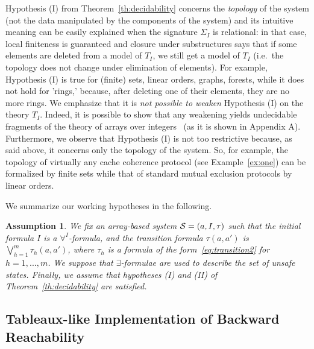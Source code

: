 \documentclass{LMCS}
\newcommand{\cSi}{\ensuremath \mathcal S}
\theoremstyle{plain}\newtheorem{assumption}[thm]{Assumption}
\theoremstyle{plain}\newtheorem{proposition}[thm]{Proposition}
\theoremstyle{plain}\newtheorem{property}[thm]{Property}
\theoremstyle{plain}\newtheorem{example}[thm]{Example}
\theoremstyle{plain}\newtheorem{claim}[thm]{Claim}
\theoremstyle{plain}\newtheorem{lemma}[thm]{Lemma}
\begin{document}
Hypothesis (I) from Theorem~\ref{th:decidability} concerns the
\emph{topology} of the system (not the data manipulated by the
components of the system)
and its intuitive meaning can be easily explained when the signature
$\Sigma_I$ is relational: in that case, local finiteness is guaranteed
and closure under substructures says that if some elements are deleted
from a model of $T_I$, we still get a model of $T_I$ (i.e.\ the
topology does not change under elimination of elements).  For example,
Hypothesis (I) is true for (finite) sets, linear orders, graphs,
forests, while it does not hold for 'rings,' because, after deleting
one of their elements, they are no more rings.
We emphasize that it is \emph{not possible to weaken} Hypothesis (I)
on the theory $T_I$.  Indeed, it is possible to show that any
weakening yields undecidable fragments of the theory of arrays over
integers~\cite{arrays} (as it is shown in Appendix A).  Furthermore,
we observe that Hypothesis (I) is not too restrictive because, as said
above, it concerns only the topology of the system.
So, for example, the topology of virtually any cache coherence
protocol (see Example~\ref{ex:one}) can be formalized by finite sets
while that of
standard mutual exclusion protocols by linear orders.





We summarize our working hypotheses in the following.
\begin{assumption}
  We fix an array-based system $\cSi=(a,I,\tau)$ such that the initial
  formula $I$ is a $\forall^I$-formula, and the transition formula
  $\tau(a,a')$ is $\bigvee_{h=1}^m \tau_h(a,a')$, where $\tau_h$ is a
  formula
of the form~\eqref{eq:transition2} for $h=1, ..., m$.
We suppose that  $\exists$-formulae are used to describe the set of
  unsafe states.
Finally, we assume that hypotheses (I) and (II) of
  Theorem~\ref{th:decidability} are satisfied.\end{assumption}




\subsection{Tableaux-like Implementation of Backward Reachability}
\label{subsec:tab}
\end{document}
